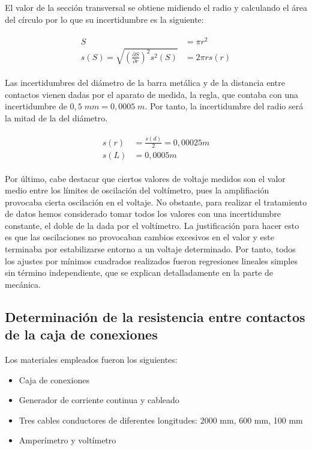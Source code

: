 \documentclass[a4paper,12pt,titlepage]{report}
\begin{document}
El valor de la sección transversal se obtiene midiendo el radio y calculando el área del círculo por lo que su incertidumbre es la siguiente:

\begin{align}
    \begin{split}
    S &= \pi r^2 \\
    s(S) = \sqrt{\left (\frac{\partial S}{\partial r}\right )^2s^2(S)} &= 2\pi r s(r)
    \end{split}
    \label{Inc sección}
\end{align}

Las incertidumbres del diámetro de la barra metálica y de la distancia entre contactos vienen dadas por el aparato de medida, la regla, que contaba con una incertidumbre de $0,5 \; mm = 0,0005 \; m$. Por tanto, la incertidumbre del radio será la mitad de la del diámetro.

\begin{align}
    \begin{split}
        s(r) &=\frac{s(d)}{2}= 0,00025 m  \\
        s(L) &= 0,0005 m
    \end{split}
\end{align}

Por último, cabe destacar que ciertos valores de voltaje medidos son el valor medio entre los límites de oscilación del voltímetro, pues la amplifiación provocaba cierta oscilación en el voltaje. No obstante, para realizar el tratamiento de datos hemos considerado tomar todos los valores con una incertidumbre constante, el doble de la dada por el voltímetro. La justificación para hacer esto es que las oscilaciones no provocaban cambios excesivos en el valor y este terminaba por estabilizarse entorno a un voltaje determinado. Por tanto, todos los ajustes por mínimos cuadrados realizados fueron regresiones lineales simples sin término independiente, que se explican detalladamente en la parte de mecánica.

\newpage

\subsection{Determinación de la resistencia entre contactos de la caja de conexiones}

Los materiales empleados fueron los siguientes:

\begin{itemize}
    \item Caja de conexiones
    \item Generador de corriente continua y cableado
    \item Tres cables conductores de diferentes longitudes: 2000 mm, 600 mm, 100 mm
    \item Amperímetro y voltímetro
\end{itemize}
\end{document}
